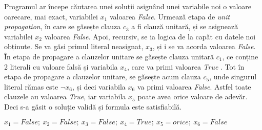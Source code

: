 Programul ar începe căutarea unei soluții asignând unei variabile noi o valoare oarecare, mai exact, variabilei $x_1$ valoarea \textit{False}. Urmează etapa de \textit{unit propagation}, în care se găsește clauza $c_3$ a fi clauză unitară, și se asignează variabilei $x_2$ valoarea \textit{False}.
Apoi, recursiv, se ia logica de la capăt cu datele noi obținute. Se va găsi primul literal neasignat, $x_3$, și i se va acorda valoarea \textit{False}. În etapa de propagare a clauzelor unitare se găsește clauza unitară $c_1$, ce conține 2 literali cu valoare falsă și variabila $x_4$, care va primi valoarea \textit{ True }. Tot în etapa de propagare a clauzelor unitare, se găsește acum clauza $c_5$, unde singurul literal rămas este $\neg x_6$, și deci variabila $x_6$ va primi valoarea \textit{False}. Astfel toate clauzele au valoarea \textit{True}, iar variabila $x_5$ poate avea orice valoare de adevăr. Deci s-a găsit o soluție validă și formula este satisfiabilă.

$x_1 = False ;~ x_2 = False ;~ x_3 = False ;~ x_4 =  True  ; ~x_5 = orice ;~ x_6 = False$

